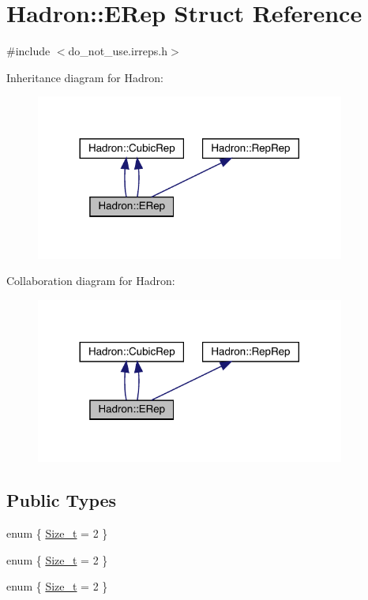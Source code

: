 \hypertarget{structHadron_1_1ERep}{}\section{Hadron\+:\+:E\+Rep Struct Reference}
\label{structHadron_1_1ERep}


{\ttfamily \#include $<$do\+\_\+not\+\_\+use.\+irreps.\+h$>$}



Inheritance diagram for Hadron\+:\nopagebreak
\begin{figure}[H]
\begin{center}
\leavevmode
\includegraphics[width=288pt]{d0/d05/structHadron_1_1ERep__inherit__graph}
\end{center}
\end{figure}


Collaboration diagram for Hadron\+:\nopagebreak
\begin{figure}[H]
\begin{center}
\leavevmode
\includegraphics[width=288pt]{d4/d5d/structHadron_1_1ERep__coll__graph}
\end{center}
\end{figure}
\subsection*{Public Types}
\begin{DoxyCompactItemize}
\item 
enum \{ \mbox{\hyperlink{structHadron_1_1ERep_a8021dea2662ee2c6c294e5f2993d2f47acb7bf608d071c4d879c9a0e2af9f2d76}{Size\+\_\+t}} = 2
 \}
\item 
enum \{ \mbox{\hyperlink{structHadron_1_1ERep_a8021dea2662ee2c6c294e5f2993d2f47acb7bf608d071c4d879c9a0e2af9f2d76}{Size\+\_\+t}} = 2
 \}
\item 
enum \{ \mbox{\hyperlink{structHadron_1_1ERep_a8021dea2662ee2c6c294e5f2993d2f47acb7bf608d071c4d879c9a0e2af9f2d76}{Size\+\_\+t}} = 2
 \}
\end{DoxyCompactItemize}
